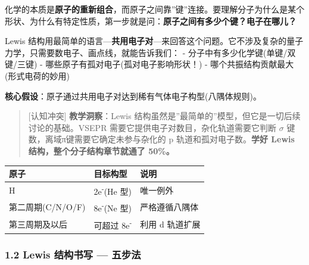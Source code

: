 化学的本质是\textbf{原子的重新组合}，而原子之间靠''键''连接。要理解分子为什么是某个形状、为什么有特定性质，第一步就是问：\textbf{原子之间有多少个键？电子在哪儿？}

Lewis 结构用最简单的语言---\textbf{共用电子对}---来回答这个问题。它不涉及复杂的量子力学，只需要数电子、画点线，就能告诉我们：
- 分子中有多少化学键(单键/双键/三键)
- 哪些原子有孤对电子(孤对电子影响形状！)
- 哪个共振结构贡献最大(形式电荷的妙用)

\textbf{核心假设}：原子通过共用电子对达到稀有气体电子构型(八隅体规则)。

\begin{quote}
{[}认知冲突{]} \textbf{教学洞察}：Lewis 结构虽然是''最简单的''模型，但它是一切后续讨论的基础。VSEPR 需要它提供电子对数目，杂化轨道需要它判断 \(\sigma\) 键数，离域π键需要它确定未参与杂化的 p 轨道和孤对电子数。\textbf{学好 Lewis 结构，整个分子结构章节就通了 50\%。}
\end{quote}

{\def\LTcaptype{none} %
\begin{longtable}[]{@{}lll@{}}
\toprule\noalign{}
原子 & 目标构型 & 说明 \\
\midrule\noalign{}
\endhead
\bottomrule\noalign{}
\endlastfoot
H & 2e\textsuperscript{-}(He 型) & 唯一例外 \\
第二周期(C/N/O/F) & 8e\textsuperscript{-}(Ne 型) & 严格遵循八隅体 \\
第三周期及以后 & 可超过 8e\textsuperscript{-} & 利用 d 轨道扩展 \\
\end{longtable}
}

\subsubsection{1.2 Lewis 结构书写 --- 五步法}\label{lewis-ux7ed3ux6784ux4e66ux5199-ux4e94ux6b65ux6cd5}

\begin{Shaded}
\begin{Highlighting}[]




\end{Highlighting}
\end{Shaded}

